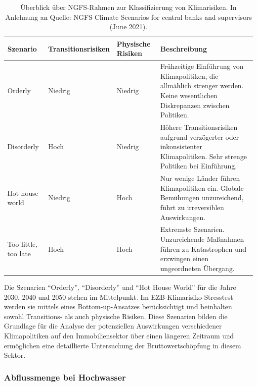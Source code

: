 \begin{table}[htbp]
    \centering
    \small
    \caption{Überblick über NGFS-Rahmen zur Klassifizierung von Klimarisiken. In Anlehnung an Quelle: NGFS Climate Scenarios for central banks and supervisors (June 2021).}
    \label{tab:ngfs-framework}
    \begin{tabularx}{1.0\textwidth}{>{\raggedright\arraybackslash}X >{\centering\arraybackslash}X >{\centering\arraybackslash}X >{\raggedright\arraybackslash}X}
        \toprule
        \textbf{Szenario} & \textbf{Transitionsrisiken} & \textbf{Physische Risiken} & \textbf{Beschreibung} \\
        \midrule
        Orderly & Niedrig & Niedrig & Frühzeitige Einführung von Klimapolitiken, die allmählich strenger werden. Keine wesentlichen Diskrepanzen zwischen Politiken. \\
        \addlinespace
        Disorderly & Hoch & Niedrig & Höhere Transitionsrisiken aufgrund verzögerter oder inkonsistenter Klimapolitiken. Sehr strenge Politiken bei Einführung. \\
        \addlinespace
        Hot house world & Niedrig & Hoch & Nur wenige Länder führen Klimapolitiken ein. Globale Bemühungen unzureichend, führt zu irreversiblen Auswirkungen. \\
        \addlinespace
        Too little, too late & Hoch & Hoch & Extremste Szenarien. Unzureichende Maßnahmen führen zu Katastrophen und erzwingen einen ungeordneten Übergang. \\
        \bottomrule
    \end{tabularx}
\end{table}
\FloatBarrier

Die Szenarien "`Orderly"', "`Disorderly"' und "`Hot House World"' für die Jahre 2030, 2040 und 2050 stehen im Mittelpunkt. Im EZB-Klimarisiko-Stresstest werden sie mittels eines Bottom-up-Ansatzes berücksichtigt und beinhalten sowohl Transitions- als auch physische
Risiken. Diese Szenarien bilden die Grundlage für die Analyse der potenziellen Auswirkungen verschiedener Klimapolitiken auf den Immobiliensektor über einen längeren Zeitraum und ermöglichen eine detaillierte Untersuchung der Bruttowertschöpfung in diesem Sektor.

\subsubsection{Abflussmenge bei Hochwasser}\label{sec:HQ}

